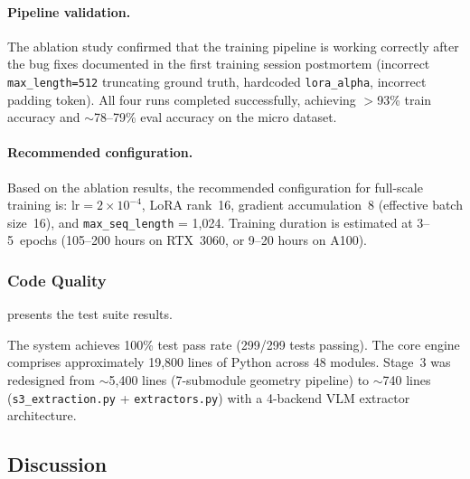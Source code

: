 \begin{table}[htbp]
\centering
\caption{Overfitting analysis: train--eval loss gap by configuration.}
\label{tab:ablation_overfit}

\end{table}

\paragraph{Pipeline validation.}
The ablation study confirmed that the training pipeline is working correctly after
the bug fixes documented in the first training session postmortem (incorrect
\texttt{max\_length=512} truncating ground truth, hardcoded \texttt{lora\_alpha},
incorrect padding token). All four runs completed successfully, achieving
$>$93\% train accuracy and $\sim$78--79\% eval accuracy on the micro dataset.

\paragraph{Recommended configuration.}
Based on the ablation results, the recommended configuration for full-scale training
is: $\text{lr} = 2 \times 10^{-4}$, LoRA rank~16, gradient accumulation~8 (effective
batch size~16), and \texttt{max\_seq\_length} = 1{,}024. Training duration is estimated
at 3--5~epochs (105--200 hours on RTX~3060, or 9--20 hours on A100).

\subsubsection{Code Quality}

 presents the test suite results.

\begin{table}[htbp]
\centering
\caption{Test suite results by component.}
\label{tab:tests}

\end{table}

The system achieves 100\% test pass rate (299/299 tests passing). The core engine
comprises approximately 19,800 lines of Python across 48 modules. Stage~3 was
redesigned from $\sim$5,400 lines (7-submodule geometry pipeline) to $\sim$740 lines
(\texttt{s3\_extraction.py} + \texttt{extractors.py}) with a 4-backend VLM extractor
architecture.

\subsection{Discussion}

